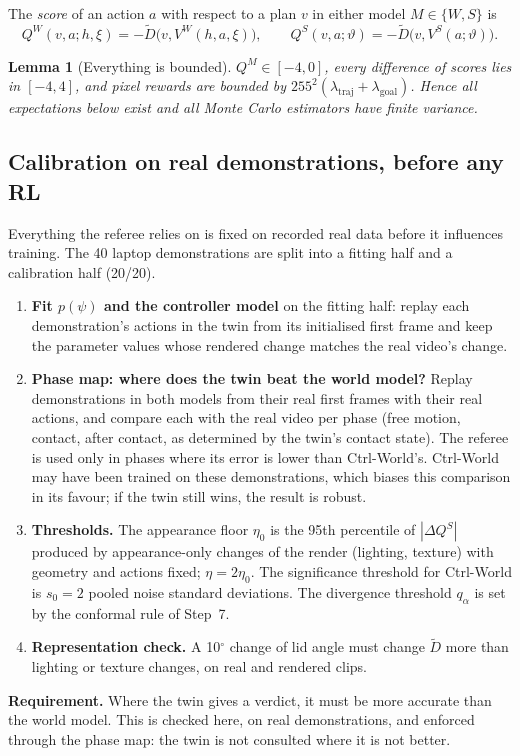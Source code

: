 \documentclass[11pt,a4paper]{article}
\theoremstyle{plain}
\newtheorem{lemma}[proposition]{Lemma}
\theoremstyle{definition}
\theoremstyle{remark}
\newcommand{\VW}{V^{W}}
\newcommand{\VS}{V^{S}}
\newcommand{\Dt}{\tilde D}
\begin{document}
The \emph{score} of an action $a$ with respect to a plan $v$ in either model $M\in\{W,S\}$ is
\begin{equation}
Q^W(v,a;h,\xi)=-\Dt\big(v,\VW(h,a,\xi)\big),\qquad Q^S(v,a;\vartheta)=-\Dt\big(v,\VS(a;\vartheta)\big).
\end{equation}

\begin{lemma}[Everything is bounded]\label{lem:bound}
$Q^M\in[-4,0]$, every difference of scores lies in $[-4,4]$, and pixel rewards are bounded by $255^2(\lambda_{\mathrm{traj}}+\lambda_{\mathrm{goal}})$. Hence all expectations below exist and all Monte Carlo estimators have finite variance.
\end{lemma}

\subsection{Calibration on real demonstrations, before any RL}\label{sec:calib}
Everything the referee relies on is fixed on recorded real data before it influences training. The 40 laptop demonstrations are split into a fitting half and a calibration half (20/20).
\begin{enumerate}[label=5.\arabic*]
\item \textbf{Fit $p(\psi)$ and the controller model} on the fitting half: replay each demonstration's actions in the twin from its initialised first frame and keep the parameter values whose rendered change matches the real video's change.
\item \textbf{Phase map: where does the twin beat the world model?} Replay demonstrations in both models from their real first frames with their real actions, and compare each with the real video per phase (free motion, contact, after contact, as determined by the twin's contact state). The referee is used only in phases where its error is lower than Ctrl-World's. Ctrl-World may have been trained on these demonstrations, which biases this comparison in its favour; if the twin still wins, the result is robust.
\item \textbf{Thresholds.} The appearance floor $\eta_0$ is the 95th percentile of $|\Delta Q^S|$ produced by appearance-only changes of the render (lighting, texture) with geometry and actions fixed; $\eta=2\eta_0$. The significance threshold for Ctrl-World is $s_0=2$ pooled noise standard deviations. The divergence threshold $q_\alpha$ is set by the conformal rule of Step~7.
\item \textbf{Representation check.} A 10$^\circ$ change of lid angle must change $\Dt$ more than lighting or texture changes, on real and rendered clips.
\end{enumerate}
\begin{why}
\textbf{Requirement.} Where the twin gives a verdict, it must be more accurate than the world model. This is checked here, on real demonstrations, and enforced through the phase map: the twin is not consulted where it is not better.
\end{why}
\end{document}
